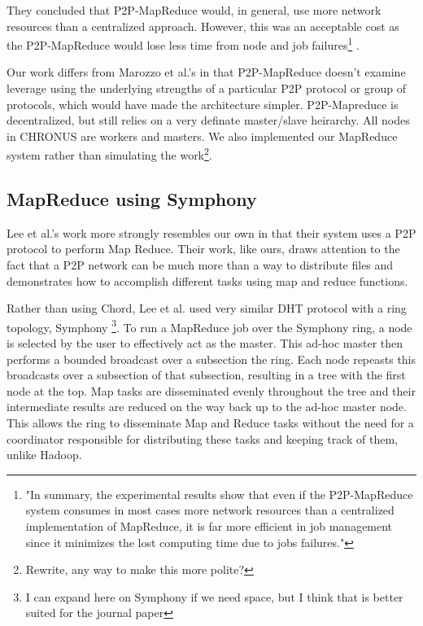 \documentclass[conference, compsocconf, letterpaper]{IEEEtran}
\begin{document}
They concluded that P2P-MapReduce would, in general, use more network resources than a centralized approach. However, this was an acceptable cost as the P2P-MapReduce would lose less time from node and job failures\footnote{"In summary, the experimental results show that even if the P2P-MapReduce system consumes in most cases more network resources than a centralized implementation of MapReduce, it is far more efficient in job management since it minimizes the lost computing time due to jobs failures."\cite{marozzo2012p2p}} \cite{marozzo2012p2p}.

Our work differs from Marozzo et al.'s in that P2P-MapReduce doesn't examine leverage using the underlying strengths of a particular P2P protocol or group of protocols, which would have made the architecture simpler.  P2P-Mapreduce is decentralized, but still relies on a very definate master/slave heirarchy.  All nodes in CHRONUS are workers and masters.  We also implemented our MapReduce system rather than simulating the work\footnote{Rewrite, any way to make this more polite?}.

\subsection{MapReduce using Symphony}
Lee et al.'s work more strongly resembles our own in that their system uses a P2P protocol to perform Map Reduce\cite{leemap}.  Their work, like ours, draws attention to the fact that a P2P network can be much more than a way to distribute files and demonstrates how to accomplish different tasks using map and reduce functions.

Rather than using Chord, Lee et al. used very similar DHT protocol with a ring topology, Symphony \cite{symphony}\footnote{I can expand here on Symphony if we need space, but I think that is better suited for the journal paper}.  To run a MapReduce job over the Symphony ring, a node is selected by the user to effectively act as the master.  This ad-hoc master then performs a bounded broadcast over a subsection the ring.  Each node repeasts this broadcasts over a subsection of that subsection, resulting in a tree with the first node at the top.  Map tasks are disseminated evenly throughout the tree and their intermediate results are reduced on the way back up to the ad-hoc master node.  This allows the ring to disseminate Map and Reduce tasks without the need for a coordinator responsible for distributing these tasks and keeping track of them, unlike Hadoop.
 
\end{document}
